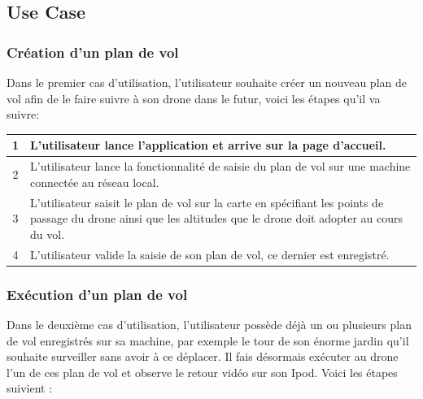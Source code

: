 \documentclass{article}
\begin{document}
        

	\newpage
	\subsection{Use Case}	
	    \subsubsection{Création d'un plan de vol}
	    Dans le premier cas d'utilisation, l'utilisateur souhaite créer un nouveau plan de vol afin de le faire suivre à son drone dans le futur, voici les étapes qu'il va suivre:
	    
	    \vspace{0.7cm}	     
	    \begin{center}
	    \renewcommand{\arraystretch}{2}
        \begin{tabularx}{15cm}{|c|X|}
            \hline
            1 & L'utilisateur lance l'application et arrive sur la page d'accueil.\\
            \hline
            2 & L'utilisateur lance la fonctionnalité de saisie du plan de vol sur une machine connectée au réseau local.\\
            \hline
            3 & L'utilisateur saisit le plan de vol sur la carte en spécifiant les points de passage du drone ainsi que les altitudes que le drone doit adopter au cours du vol. \\
            \hline
            4 & L'utilisateur valide la saisie de son plan de vol, ce dernier est enregistré. \\
            \hline
        \end{tabularx}
        \end{center}
        
	    \vspace{0.8cm}
	    
	    \subsubsection{Exécution d'un plan de vol}
	    Dans le deuxième cas d’utilisation, l'utilisateur possède déjà un ou plusieurs plan de vol enregistrés sur sa machine, par exemple le tour de son énorme jardin qu'il souhaite surveiller sans avoir à ce déplacer. Il fais désormais exécuter au drone l'un de ces plan de vol et observe le retour vidéo sur son Ipod.
	    Voici les étapes suivient :
	    
\end{document}

